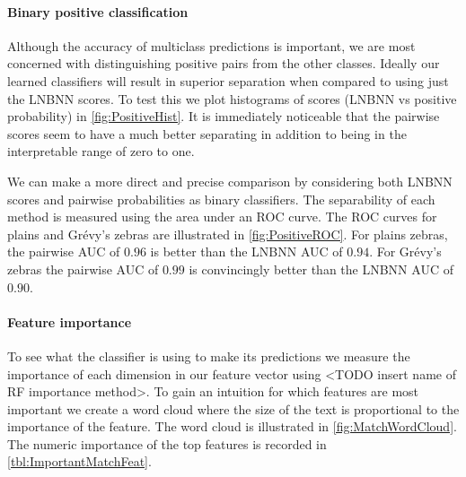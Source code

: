         \paragraph{Binary positive classification}
        Although the accuracy of multiclass predictions is important, we are most concerned with distinguishing
          positive pairs from the other classes.
        Ideally our learned classifiers will result in superior separation when compared to using just the LNBNN
          scores.
        To test this we plot histograms of scores (LNBNN vs positive probability) in \cref{fig:PositiveHist}.
        It is immediately noticeable that the pairwise scores seem to have a much better separating in addition
          to being in the interpretable range of zero to one.


        \PositiveHist{}

        We can make a more direct and precise comparison by considering both LNBNN scores and pairwise
          probabilities as binary classifiers.
        The separability of each method is measured using the area under an ROC curve.
        The ROC curves for plains and Grévy's zebras are illustrated in \cref{fig:PositiveROC}.
        For plains zebras, the pairwise AUC of $0.96$ is better than the LNBNN AUC of $0.94$.
        For Grévy's zebras the pairwise AUC of $0.99$ is convincingly better than the LNBNN AUC of $0.90$.

        \PositiveROC{}


        \paragraph{Feature importance}
        To see what the classifier is using to make its predictions we measure the importance of each dimension
          in our feature vector using <TODO insert name of RF importance method>.
        To gain an intuition for which features are most important we create a word cloud where the size of the
          text is proportional to the importance of the feature.
        The word cloud is illustrated in \cref{fig:MatchWordCloud}.
        The numeric importance of the top features is recorded in \cref{tbl:ImportantMatchFeat}.

